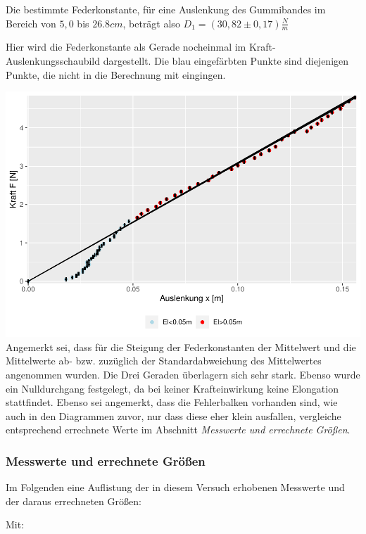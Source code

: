 \documentclass[
  9pt,
]{article}
\begin{document}
Die bestimmte Federkonstante, für eine Auslenkung des Gummibandes im
Bereich von \(5,0\) bis \(26.8cm\), beträgt also
\(D_1=(30,82\pm 0,17)\frac{N}{m}\)

\newpage

Hier wird die Federkonstante als Gerade nocheinmal im
Kraft-Auslenkungsschaubild dargestellt. Die blau eingefärbten Punkte
sind diejenigen Punkte, die nicht in die Berechnung mit eingingen.

\includegraphics{DehnbareStoffe_files/figure-latex/unnamed-chunk-11-1.pdf}
Angemerkt sei, dass für die Steigung der Federkonstanten der Mittelwert
und die Mittelwerte ab- bzw. zuzüglich der Standardabweichung des
Mittelwertes angenommen wurden. Die Drei Geraden überlagern sich sehr
stark. Ebenso wurde ein Nulldurchgang festgelegt, da bei keiner
Krafteinwirkung keine Elongation stattfindet. Ebenso sei angemerkt, dass
die Fehlerbalken vorhanden sind, wie auch in den Diagrammen zuvor, nur
dass diese eher klein ausfallen, vergleiche entsprechend errechnete
Werte im Abschnitt \textit{Messwerte und errechnete Größen}.

\hypertarget{messwerte-und-errechnete-gruxf6uxdfen}{%
\subsubsection{Messwerte und errechnete
Größen}\label{messwerte-und-errechnete-gruxf6uxdfen}}

Im Folgenden eine Auflistung der in diesem Versuch erhobenen Messwerte
und der daraus errechneten Größen:

Mit:
\end{document}

